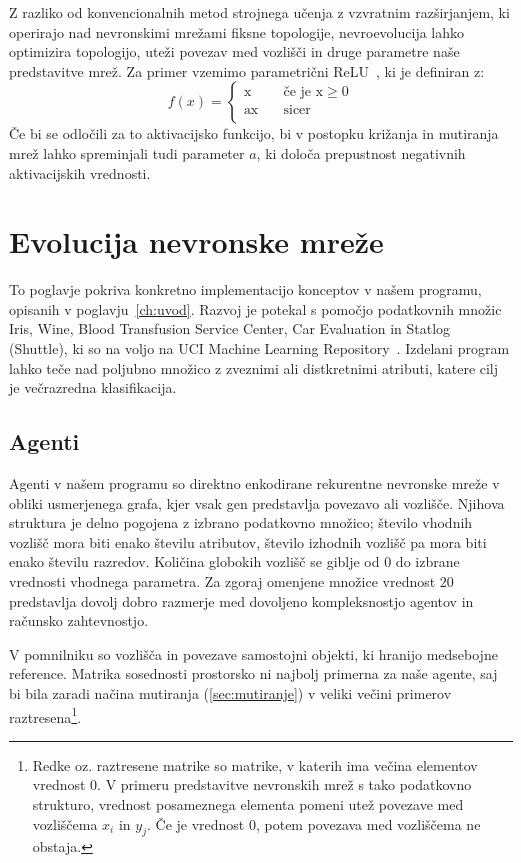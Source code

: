 \documentclass[a4paper,12pt,openright]{book}
\begin{document}
    Z razliko od konvencionalnih metod strojnega učenja z vzvratnim razširjanjem, ki operirajo nad nevronskimi mrežami
    fiksne topologije, nevroevolucija lahko optimizira topologijo, uteži povezav med vozlišči in druge parametre naše
    predstavitve mrež.
    Za primer vzemimo parametrični ReLU~\cite{he2015delving}, ki je definiran z:
    \begin{equation}
        f(x)=
        \begin{cases}
            \text{x} & \quad\text{če je x}\ge0\\
            \text{ax} & \quad\text{sicer}\\
        \end{cases}
        \label{eq:parametric_relu}
    \end{equation}
    Če bi se odločili za to aktivacijsko funkcijo, bi v postopku križanja in mutiranja mrež lahko spreminjali tudi
    parameter $a$, ki določa prepustnost negativnih aktivacijskih vrednosti.

    \chapter{Evolucija nevronske mreže}\label{ch:evolucija-nevronske-mreze}
    To poglavje pokriva konkretno implementacijo konceptov v našem programu, opisanih v poglavju~\ref{ch:uvod}.
    Razvoj je potekal s pomočjo podatkovnih množic Iris, Wine, Blood Transfusion Service Center, Car Evaluation in Statlog (Shuttle), ki so
    na voljo na UCI Machine Learning Repository~\cite{Dua:2019}.
    Izdelani program lahko teče nad poljubno množico z zveznimi ali distkretnimi atributi, katere cilj je večrazredna klasifikacija.

    \section{Agenti}\label{sec:agenti}
    Agenti v našem programu so direktno enkodirane rekurentne nevronske mreže v obliki usmerjenega grafa, kjer vsak gen
    predstavlja povezavo ali vozlišče.
    Njihova struktura je delno pogojena z izbrano podatkovno množico;
    število vhodnih vozlišč mora biti enako številu atributov, število izhodnih vozlišč pa mora biti enako številu razredov.
    Količina globokih vozlišč se giblje od 0 do izbrane vrednosti vhodnega parametra.
    Za zgoraj omenjene množice vrednost $20$ predstavlja dovolj dobro razmerje med dovoljeno kompleksnostjo agentov in
    računsko zahtevnostjo.

    V pomnilniku so vozlišča in povezave samostojni objekti, ki hranijo medsebojne reference.
    Matrika sosednosti prostorsko ni najbolj primerna za naše agente, saj bi bila zaradi načina mutiranja (\ref{sec:mutiranje})
    v veliki večini primerov raztresena\footnote{Redke oz. raztresene matrike so matrike, v katerih ima večina elementov vrednost 0.
    V primeru predstavitve nevronskih mrež s tako podatkovno strukturo, vrednost posameznega elementa pomeni utež povezave
    med vozliščema $x_i$ in $y_j$.
    Če je vrednost 0, potem povezava med vozliščema ne obstaja.}.
\end{document}
